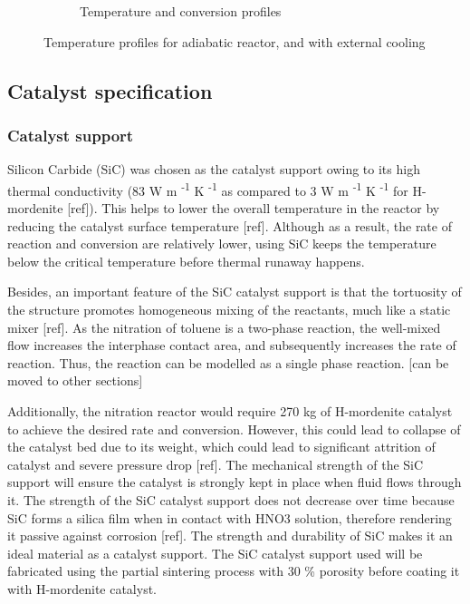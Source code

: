 \begin{figure}[h]
\begin{subfigure}{0.32\linewidth}
        \caption{Temperature and conversion profiles}
    \end{subfigure}

    \caption{Temperature profiles for adiabatic reactor, and with external cooling}
    \label{fig:simple-tube}
\end{figure}

\subsection{Catalyst specification}
\subsubsection{Catalyst support}
Silicon Carbide (SiC) was chosen as the catalyst support owing to its high thermal conductivity (83 W m \textsuperscript{-1} K \textsuperscript{-1} as compared to 3 W m \textsuperscript{-1} K \textsuperscript{-1} for H-mordenite [ref]). This helps to lower the overall temperature in the reactor by reducing the catalyst surface temperature [ref]. Although as a result, the rate of reaction and conversion are relatively lower, using SiC keeps the temperature below the critical temperature before thermal runaway happens. 

Besides, an important feature of the SiC catalyst support is that the tortuosity of the structure promotes homogeneous mixing of the reactants, much like a static mixer [ref]. As the nitration of toluene is a two-phase reaction, the well-mixed flow increases the interphase contact area, and subsequently increases the rate of reaction. Thus, the reaction can be modelled as a single phase reaction. [can be moved to other sections] 

Additionally, the nitration reactor would require 270 kg of H-mordenite catalyst to achieve the desired rate and conversion. However, this could lead to collapse of the catalyst bed due to its weight, which could lead to significant attrition of catalyst and severe pressure drop [ref]. The mechanical strength of the SiC support will ensure the catalyst is strongly kept in place when fluid flows through it. The strength of the SiC catalyst support does not decrease over time because SiC forms a silica film when in contact with HNO3 solution, therefore rendering it passive against corrosion [ref]. The strength and durability of SiC makes it an ideal material as a catalyst support. The SiC catalyst support used will be fabricated using the partial sintering process with 30 \% porosity before coating it with H-mordenite catalyst.

